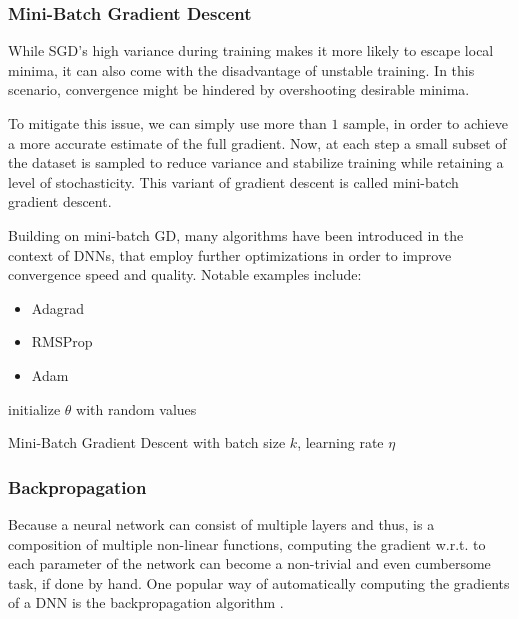 \subsubsection{Mini-Batch Gradient Descent}
While SGD's high variance during training makes it more likely to escape local minima, it can also come with the disadvantage of unstable training. In this scenario, convergence might be hindered by overshooting desirable minima.

To mitigate this issue, we can simply use more than $1$ sample, in order to achieve a more accurate estimate of the full gradient. Now, at each step a small subset of the dataset is sampled to reduce variance and stabilize training while retaining a level of stochasticity. This variant of gradient descent is called mini-batch gradient descent.

Building on mini-batch GD, many algorithms have been introduced in the context of DNNs, that employ further optimizations in order to improve convergence speed and quality. Notable examples include:
\begin{itemize}
    \item Adagrad \cite{duchi2011adaptive}
    \item RMSProp \cite{hinton2012neural}
    \item Adam \cite{kingma2014adam}
\end{itemize}

\begin{algorithm}
    \SetAlgoLined
    initialize $\theta$ with random values \;
    \caption{Mini-Batch Gradient Descent with batch size $k$, learning rate $\eta$}
\end{algorithm}

\subsubsection{Backpropagation}
\label{sec:backprop}
Because a neural network can consist of multiple layers and thus, is a composition of multiple non-linear functions, computing the gradient w.r.t. to each parameter of the network can become a non-trivial and even cumbersome task, if done by hand. One popular way of automatically computing the gradients of a DNN is the backpropagation algorithm \cite{rumelhart1988learning}.

